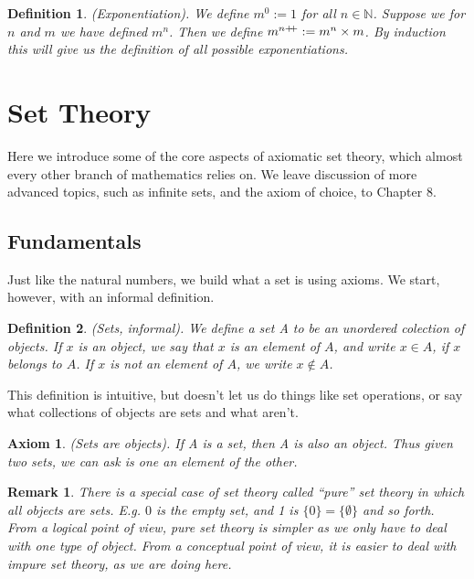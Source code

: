 \documentclass{article}
\newtheorem{definition}{Definition}[subsection]
\newtheorem{remark}{Remark}[subsection]
\newtheorem{axiom}{Axiom}[section]
\newcommand{\N}{\mathbb{N}}
\newcommand{\pp}{\mathbin{+\mkern-5mu+}}
\let\it\textit
\begin{document}
\begin{definition}
	(Exponentiation). We define $m^0 := 1$ for all $n \in \N$. Suppose	
	we for $n$ and $m$ we have defined $m^n$. Then we define 
	$m^{n\pp} := m^n \times m$. By induction this will give us the
	definition of all possible exponentiations.
\end{definition}
\newpage



\section{Set Theory}

Here we introduce some of the core aspects of axiomatic set theory, 
which almost every other branch of mathematics relies on. We leave 
discussion of more advanced topics, such as infinite sets, and 
the axiom of choice, to Chapter 8.

\subsection{Fundamentals}

Just like the natural numbers, we build what a set is using axioms. We start,
however, with an informal definition.

\begin{definition}
	(Sets, informal). We define a set A to be an unordered 
	colection of objects. If $x$ is an object, we say that $x$
	is an element of $A$, and write $x \in A$, if $x$ belongs to
	$A$. If $x$ is not an element of $A$, we write $x \notin A$.
\end{definition}

This definition is intuitive, but doesn't let us do things like 
set operations, or say what collections of objects are sets and what 
aren't. 

\begin{axiom}
	(Sets are objects). If A is a set, then A is also an object. Thus 
	given two sets, we can ask is one an element of the other.
\end{axiom}

\begin{remark}
	There is a special case of set theory called ``pure'' set
	theory in which \it{all} objects are sets. E.g. $0$ 
	is the empty set, and 1 is $\{0\} = \{ \emptyset \}$ and 
	so forth. From a logical point of view, pure set theory 
	is simpler as we only have to deal with one type of object. 
	From  a conceptual point of view, it is easier to deal 
	with impure set theory, as we are doing here.
\end{remark}
\end{document}
